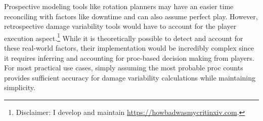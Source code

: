 Prospective modeling tools like rotation planners may have an easier time reconciling with factors like downtime and can also assume perfect play. However, retrospective damage variability tools would have to account for the player execution aspect.\footnote{Disclaimer: I develop and maintain \href{https://howbadwasmycritinxiv.com}{https://howbadwasmycritinxiv.com}.} While it is theoretically possible to detect and account for these real-world factors, their implementation would be incredibly complex since it requires inferring and accounting for proc-based decision making from players. For most practical use cases, simply assuming the most probable proc counts provides sufficient accuracy for damage variability calculations while maintaining simplicity.